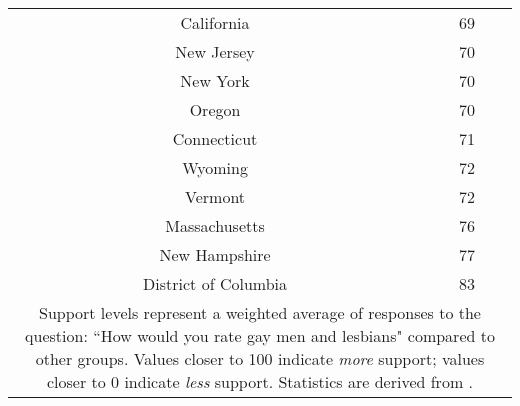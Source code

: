 \begin{spacing}{1}
\begin{longtable}{|c|c|}
California & 69\\
New Jersey & 70\\
New York & 70\\
Oregon & 70\\
Connecticut & 71\\
Wyoming & 72\\
Vermont & 72\\
Massachusetts & 76\\
New Hampshire & 77\\
District of Columbia & 83\\
\hline
\multicolumn{2}{p{0.8\linewidth}}{\footnotesize Support levels represent a weighted average of responses to the question: ``How would you rate gay men and lesbians" compared to other groups. Values closer to 100 indicate \textit{more} support; values closer to 0 indicate \textit{less} support. Statistics are derived from \citet{29}.} \\ 
\end{longtable}
\end{spacing}
